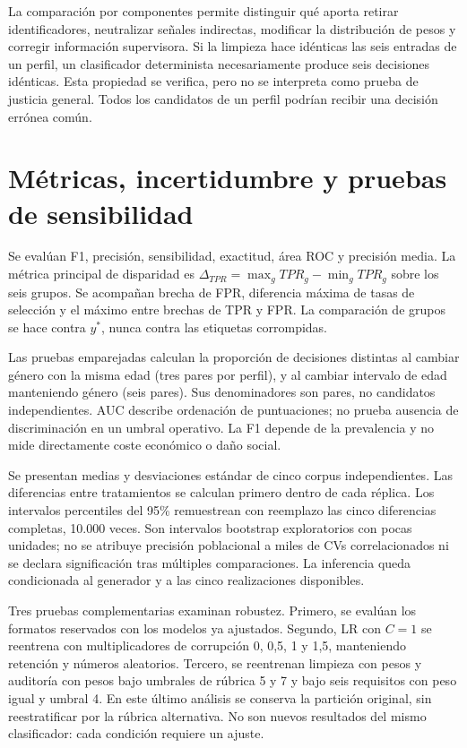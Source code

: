 \documentclass[11pt,a4paper,oneside]{report}
\begin{document}
La comparación por componentes permite distinguir qué aporta retirar identificadores, neutralizar señales indirectas, modificar la distribución de pesos y corregir información supervisora. Si la limpieza hace idénticas las seis entradas de un perfil, un clasificador determinista necesariamente produce seis decisiones idénticas. Esta propiedad se verifica, pero no se interpreta como prueba de justicia general. Todos los candidatos de un perfil podrían recibir una decisión errónea común.

\section{Métricas, incertidumbre y pruebas de sensibilidad}
Se evalúan F1, precisión, sensibilidad, exactitud, área ROC y precisión media. La métrica principal de disparidad es $\Delta_{TPR}=\max_gTPR_g-\min_gTPR_g$ sobre los seis grupos. Se acompañan brecha de FPR, diferencia máxima de tasas de selección y el máximo entre brechas de TPR y FPR. La comparación de grupos se hace contra $y^*$, nunca contra las etiquetas corrompidas.

Las pruebas emparejadas calculan la proporción de decisiones distintas al cambiar género con la misma edad (tres pares por perfil), y al cambiar intervalo de edad manteniendo género (seis pares). Sus denominadores son pares, no candidatos independientes. AUC describe ordenación de puntuaciones; no prueba ausencia de discriminación en un umbral operativo. La F1 depende de la prevalencia y no mide directamente coste económico o daño social.

Se presentan medias y desviaciones estándar de cinco corpus independientes. Las diferencias entre tratamientos se calculan primero dentro de cada réplica. Los intervalos percentiles del 95\% remuestrean con reemplazo las cinco diferencias completas, 10.000 veces. Son intervalos bootstrap exploratorios con pocas unidades; no se atribuye precisión poblacional a miles de CVs correlacionados ni se declara significación tras múltiples comparaciones. La inferencia queda condicionada al generador y a las cinco realizaciones disponibles.

Tres pruebas complementarias examinan robustez. Primero, se evalúan los formatos reservados con los modelos ya ajustados. Segundo, LR con $C=1$ se reentrena con multiplicadores de corrupción 0, 0,5, 1 y 1,5, manteniendo retención y números aleatorios. Tercero, se reentrenan limpieza con pesos y auditoría con pesos bajo umbrales de rúbrica 5 y 7 y bajo seis requisitos con peso igual y umbral 4. En este último análisis se conserva la partición original, sin reestratificar por la rúbrica alternativa. No son nuevos resultados del mismo clasificador: cada condición requiere un ajuste.
\end{document}

